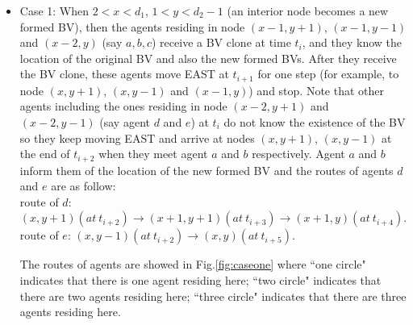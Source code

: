 \begin{itemize}
\item Case 1: When $2<x<d_1$, $1<y<d_2-1$ (an interior node becomes a new formed BV), then the agents residing in node $(x-1, y+1)$, $(x-1, y-1)$ and $(x-2, y)$ (say $a,b,c$) receive a BV clone at time $t_i$, and  they know the location of the original BV and also the new formed BVs. After they receive the BV clone, these agents move EAST at $t_{i+1}$ for one step (for example, to node $(x, y+1)$, $(x, y-1)$ and $(x-1, y)$) and stop. Note that other agents including the ones residing in node $(x-2, y+1)$ and $(x-2, y-1)$ (say agent $d$ and $e$) at $t_i$ do not know the existence of the BV so they keep moving EAST and arrive at nodes $(x, y+1)$, $(x, y-1)$ at the end of $t_{i+2}$ when they meet agent $a$ and $b$ respectively. Agent $a$ and $b$ inform them of the location of the new formed BV and the routes of agents $d$ and $e$ are as follow:\\
route of $d$: $(x, y+1)(at\ t_{i+2}){\rightarrow}(x+1,y+1)(at\ t_{i+3}){\rightarrow}(x+1,y)(at\ t_{i+4})$.\\
route of $e$: $(x, y-1)(at\ t_{i+2}){\rightarrow}(x, y)(at\ t_{i+5})$.

The routes of agents are showed in Fig.\ref{fig:caseone} where ``one circle" indicates that there is one agent residing here; ``two circle" indicates that there are two agents residing here; ``three circle" indicates that there are three agents residing here. 


\end{itemize}
